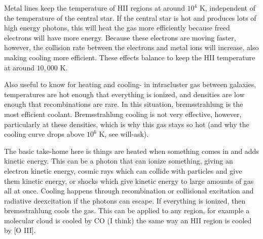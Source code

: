 Metal lines keep the temperature of HII regions at around $10^4$ K, independent of the temperature 
of the central star.  If the central star is hot and produces lots of high energy photons, this 
will heat the gas more efficiently because freed electrons will have more energy.  Because these 
electrons are moving faster, however, the collision rate between the electrons and metal ions 
will increase, also making cooling more efficient.  These effects balance to keep the 
HII temperature at around $10,000$ K.  

Also useful to know for heating and cooling- in intracluster gas between galaxies, temperatures 
are hot enough that everything is ionized, and densities are low enough that recombinations 
are rare.  In this situation, bremsstrahlung is the most efficient coolant.  Bremsstrahlung 
cooling is not very effective, however, particularly at these densities, which is why this 
gas stays so hot (and why the cooling curve drops above $10^6$ K, see will-ask).

The basic take-home here is things are heated when something comes in and adds kinetic energy.  
This can be a photon that can ionize something, giving an electron kinetic energy, cosmic rays 
which can collide with particles and give them kinetic energy, or shocks which give kinetic 
energy to large amounts of gas all at once.  Cooling happens through recombination or collisional 
excitation and radiative deexcitation if the photons can escape.  If everything is ionized, 
then bremsstrahlung cools the gas.  This can be applied to any region, for example a molecular 
cloud is cooled by CO (I think) the same way an HII region is cooled by [O III].


